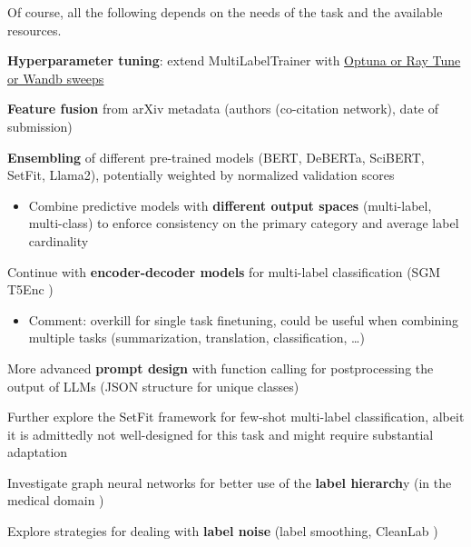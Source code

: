 \documentclass[11pt,letterpaper]{article}
\begin{document}
Of course, all the following depends on the needs of the task and the available resources.
\small
\begin{todolist}
  \item \textbf{Hyperparameter tuning}: extend MultiLabelTrainer with \href{https://huggingface.co/docs/transformers/en/hpo_train}{Optuna or Ray Tune or Wandb sweeps}
  \item \textbf{Feature fusion} from arXiv metadata (\eg authors (co-citation network), date of submission)
  \item \textbf{Ensembling} of different pre-trained models (\eg BERT, DeBERTa, SciBERT, SetFit, Llama2), potentially weighted by normalized validation scores
  \begin{itemize}
    \item Combine predictive models with \textbf{different output spaces} (\eg multi-label, multi-class) to enforce consistency on the primary category and average label cardinality
  \end{itemize}
  \item Continue with \textbf{encoder-decoder models} for multi-label classification (\eg SGM \cite{syang2018sgm} T5Enc \cite{kementchedjhieva2023exploration})
  \begin{itemize}
    \item Comment: overkill for single task finetuning, could be useful when combining multiple tasks (summarization, translation, classification, \ldots)
  \end{itemize}
  \item More advanced \textbf{prompt design} with function calling for postprocessing the output of LLMs (\eg JSON structure for unique classes)
  \item Further explore the SetFit framework for few-shot multi-label classification, albeit it is admittedly not well-designed for this task and might require substantial adaptation
  \item Investigate graph neural networks for better use of the \textbf{label hierarch}y (\eg in the medical domain \cite{chi2024graph})
  \item Explore strategies for dealing with \textbf{label noise} (\eg label smoothing, CleanLab \cite{kumar2020robust,oyen2022robustness})
\end{todolist}

{\small


}
\end{document}
